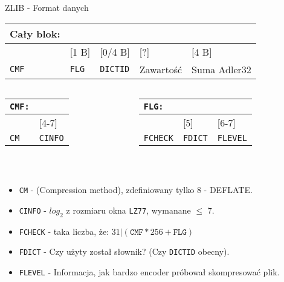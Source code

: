 \documentclass[presentation]{beamer}
\begin{document}
\begin{frame}[label={sec:org1fd7486}]{ZLIB - Format danych}
\begin{center}
\begin{tabular}{lllll}
Cały blok: &  &  &  & \\
\hline
[1 B] & [1 B] & [0/4 B] & [?] & [4 B]\\
{\color{blue}\texttt{CMF}} & {\color{blue}\texttt{FLG}} & {\color{blue}\texttt{DICTID}} & Zawartość & Suma Adler32\\
\end{tabular}
\end{center}

\begin{columns}
\begin{column}{0.45\columnwidth}
\vspace{-13pt}
\begin{center}
\begin{tabular}{ll}
{\color{blue}\texttt{CMF:}} & \\
\hline
[0-3] & [4-7]\\
{\color{blue}\texttt{CM}} & {\color{blue}\texttt{CINFO}}\\
\end{tabular}
\end{center}
\end{column}

\begin{column}{0.45\columnwidth}
\vspace{-13pt}
\begin{center}
\begin{tabular}{lll}
{\color{blue}\texttt{FLG:}} &  & \\
\hline
[0-4] & [5] & [6-7]\\
{\color{blue}\texttt{FCHECK}} & {\color{blue}\texttt{FDICT}} & {\color{blue}\texttt{FLEVEL}}\\
\end{tabular}
\end{center}
\end{column}
\end{columns}

\begin{block}{ }
\begin{itemize}
\item {\color{blue}\texttt{CM}} - (Compression method), zdefiniowany tylko 8 - DEFLATE.
\item {\color{blue}\texttt{CINFO}} - \(log_2\) z rozmiaru okna \texttt{LZ77}, wymanane \(\le\) 7.
\item {\color{blue}\texttt{FCHECK}} - taka liczba, że: \(31 | (\texttt{CMF}*256 + \texttt{FLG})\)
\item {\color{blue}\texttt{FDICT}} - Czy użyty został słownik? (Czy {\color{blue}\texttt{DICTID}} obecny).
\item {\color{blue}\texttt{FLEVEL}} - Informacja, jak bardzo encoder próbował skompresować plik.
\end{itemize}
\end{block}
\end{frame}
\end{document}
